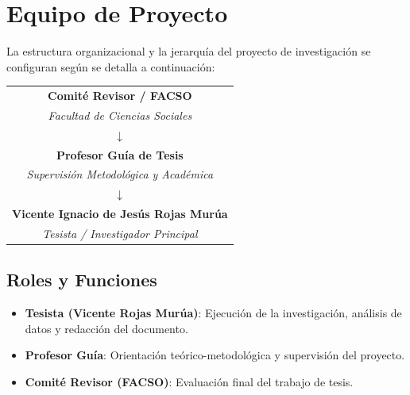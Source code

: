 \section{Equipo de Proyecto}

La estructura organizacional y la jerarquía del proyecto de investigación se configuran según se detalla a continuación:

\begin{center}
\begin{tabular}{|c|}
    \hline
    \textbf{Comité Revisor / FACSO} \\
    \textit{Facultad de Ciencias Sociales} \\
    \hline
    $\downarrow$ \\
    \hline
    \textbf{Profesor Guía de Tesis} \\
    \textit{Supervisión Metodológica y Académica} \\
    \hline
    $\downarrow$ \\
    \hline
    \textbf{Vicente Ignacio de Jesús Rojas Murúa} \\
    \textit{Tesista / Investigador Principal} \\
    \hline
\end{tabular}
\end{center}

\subsection{Roles y Funciones}
\begin{itemize}
    \item \textbf{Tesista (Vicente Rojas Murúa)}: Ejecución de la investigación, análisis de datos y redacción del documento.
    \item \textbf{Profesor Guía}: Orientación teórico-metodológica y supervisión del proyecto.
    \item \textbf{Comité Revisor (FACSO)}: Evaluación final del trabajo de tesis.
\end{itemize}